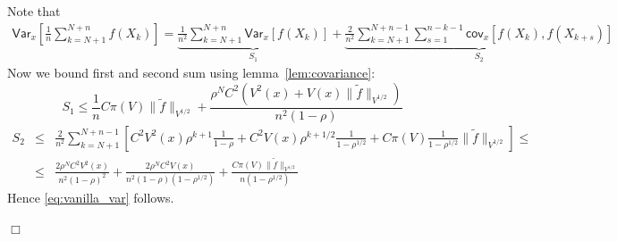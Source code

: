 \documentclass[bj]{imsart}
\def\PVar{\mathsf{Var}}
\def\PCov{\mathsf{cov}}
\newcommand{\proofendsign}{$\Box$}
\newenvironment{proof}{{\noindent \bf Proof }}
 {{\hspace*{\fill}\proofendsign\par\bigskip}}
\begin{document}
\begin{proof}
Note that
\begin{eqnarray*}
\PVar_x \left[ \frac{1}{n}\sum\limits_{k=N+1}^{N+n}f(X_k) \right] = \underbrace{\frac{1}{n^2}\sum\limits_{k=N+1}^{N+n}\PVar_x \left[ f(X_k) \right]}_{S_1} + \underbrace{\frac{2}{n^2}\sum\limits_{k=N+1}^{N+n-1}\sum\limits_{s=1}^{n-k-1}\PCov_x\left[f(X_k),f(X_{k+s})\right]}_{S_2}
\end{eqnarray*}
Now we bound first and second sum using lemma~\ref{lem:covariance}:
\[
S_1 \leq \frac{1}{n}C\pi(V)\|\tilde{f}\|_{V^{1/2}} + \frac{\rho^N C^2\left(V^2(x) + V(x)\|\tilde{f}\|_{V^{1/2}}\right)}{n^2(1-\rho)}
\]
\begin{eqnarray*}
S_2 & \leq & \frac{2}{n^2}\sum\limits_{k=N+1}^{N+n-1}\left[C^2V^2(x)\rho^{k+1}\frac{1}{1-\rho} + C^2V(x)\rho^{k+1/2}\frac{1}{1-\rho^{1/2}} + C\pi(V)\frac{1}{1-\rho^{1/2}}\|\tilde{f}\|_{V^{1/2}}\right] \leq \\
& \leq & \frac{2\rho^NC^2V^2(x)}{n^2(1-\rho)^2} + \frac{2\rho^NC^2V(x)}{n^2(1-\rho)(1-\rho^{1/2})} + \frac{C\pi(V)\|\tilde{f}\|_{V^{1/2}}}{n(1-\rho^{1/2})}
\end{eqnarray*}
Hence \eqref{eq:vanilla_var} follows.
\end{proof}
\end{document}
